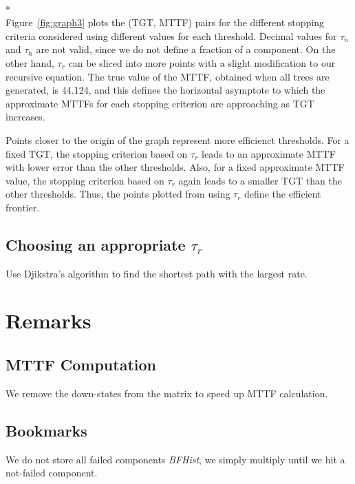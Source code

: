 \documentclass[12pt]{article}
\newcommand{\varName}[1]{\textrm{\it#1}}
\begin{document}
\begin{minipage}[c]{\textwidth}
	\label{fig:graph3}
\end{minipage}
\\*\\

Figure~\ref{fig:graph3} plots the (TGT, MTTF) pairs for the different stopping
criteria considered using different values for each threshold. Decimal values
for $\tau_n$ and $\tau_h$ are not valid, since we do not define a fraction of
a component. On the other hand, $\tau_r$ can be sliced into more points with a
slight modification to our recursive equation. The true value of the MTTF,
obtained when all trees are generated, is 44.124, and this defines the
horizontal asymptote to which the approximate MTTFs for each stopping
criterion are approaching as TGT increases. 

Points closer to the origin of the graph represent more efficienct thresholds.
For a fixed TGT, the stopping criterion based on $\tau_r$ leads to an
approximate MTTF with lower error than the other thresholds.  Also, for a
fixed approximate MTTF value, the stopping criterion based on $\tau_r$ again
leads to a smaller TGT than the other thresholds.  Thus, the points plotted
from using $\tau_r$ define the efficient frontier.

\subsection{Choosing an appropriate $\tau_r$}
Use Djikstra's algorithm to find the shortest path with the largest rate.

\section{Remarks}
\subsection{MTTF Computation}
We remove the down-states from the matrix to speed up MTTF calculation.

\subsection{Bookmarks}
We do not store all failed components \varName{BFHist}, we simply multiply until
we hit a not-failed component.



\end{document}
